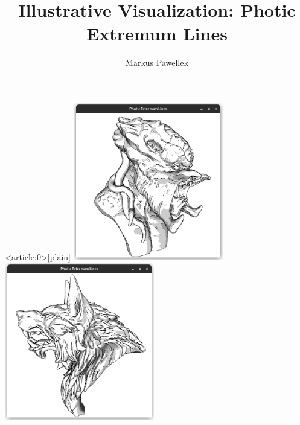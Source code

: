 \documentclass[aspectratio=169]{beamer}
\title{%
  Illustrative Visualization: Photic Extremum Lines%
}
\author{Markus Pawellek}
\begin{document}

{ %
  \begin{frame}<article:0>[plain]
    \center
    \includegraphics[width=0.49\textwidth,trim={15px 15 15 50},clip]{images/predator-intro.png}
    \includegraphics[width=0.49\textwidth,trim={15px 15 15 50},clip]{images/werewolf-intro.png}
  \end{frame}
}

\end{document}
